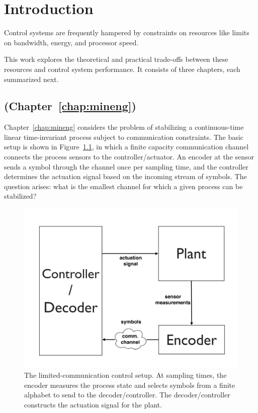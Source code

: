 
\chapter{Introduction}
\label{chap:intro}


Control systems are frequently hampered by constraints on resources like limits on bandwidth, energy, and processor speed. 

This work explores the theoretical and practical trade-offs between these resources and control system performance. It consists of three chapters, each summarized next.



\section*{ (Chapter~\ref{chap:mineng})}

Chapter~\ref{chap:mineng} considers the problem of stabilizing a continuous-time linear
time-invariant process subject to communication constraints. The basic setup is shown in Figure~\ref{fig:block_diagram2}, 
in which a finite capacity communication channel connects the
process sensors to the controller/actuator. An encoder at the sensor
sends a symbol through the channel once per sampling time, and the
controller determines the actuation signal based on the incoming
stream of symbols. The question arises: what is the smallest channel
\bitrate{} for which a given process can be stabilized? 

\begin{figure}[h]
  \centering
  \includegraphics[angle=0,width=\figwidth]{figures/block_diagram_intro}
  \caption{The limited-communication control setup. At sampling times, the encoder measures the process state and selects
      symbols from a finite alphabet to send to the
      decoder/controller. The decoder/controller constructs the actuation
      signal for the plant.}
  \label{fig:block_diagram2}
\end{figure}

